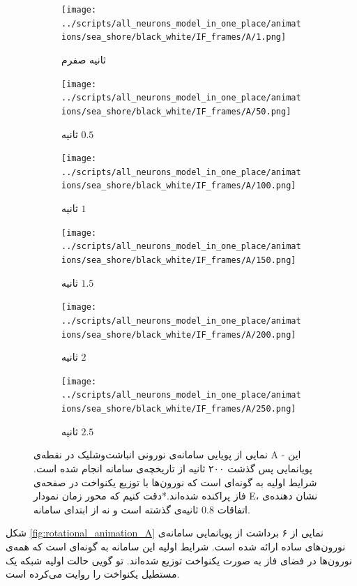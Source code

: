 \newpage
\begin{figure}[!h]
	\begin{subfigure}{0.5\textwidth}
		\texttt{[image: ../scripts/all\_neurons\_model\_in\_one\_place/animations/sea\_shore/black\_white/IF\_frames/A/1.png]}
		\caption{
			ثانیه صفرم		
		}
	\end{subfigure}
	\hfill
	\begin{subfigure}{0.5\textwidth}
		\texttt{[image: ../scripts/all\_neurons\_model\_in\_one\_place/animations/sea\_shore/black\_white/IF\_frames/A/50.png]}
		\caption{
			ثانیه $0.5$
		}
	\end{subfigure}
	\hfill
	\begin{subfigure}{0.5\textwidth}
		\texttt{[image: ../scripts/all\_neurons\_model\_in\_one\_place/animations/sea\_shore/black\_white/IF\_frames/A/100.png]}
		\caption{
			ثانیه $1$		
		}
	\end{subfigure}
	\hfill
	\begin{subfigure}{0.5\textwidth}
		\texttt{[image: ../scripts/all\_neurons\_model\_in\_one\_place/animations/sea\_shore/black\_white/IF\_frames/A/150.png]}
		\caption{
			ثانیه $1.5$
		}
	\end{subfigure}
	\hfill
	\begin{subfigure}{0.5\textwidth}
		\texttt{[image: ../scripts/all\_neurons\_model\_in\_one\_place/animations/sea\_shore/black\_white/IF\_frames/A/200.png]}
		\caption{
			ثانیه $2$
		}
	\end{subfigure}
	\hfill
	\begin{subfigure}{0.5\textwidth}
		\texttt{[image: ../scripts/all\_neurons\_model\_in\_one\_place/animations/sea\_shore/black\_white/IF\_frames/A/250.png]}
		\caption{
			ثانیه $2.5$
		}
	\end{subfigure}
	\hfill
	\caption{
		نمایی از پویایی سامانه‌ی نورونی انباشت‌وشلیک در نقطه‌ی A - این پویانمایی پس گذشت ۲۰۰ ثانیه از تاریخچه‌ی سامانه انجام شده است. شرایط اولیه به گونه‌ای است که نورون‌ها با توزیع یکنواخت در صفحه‌ی فاز پراکنده شده‌اند.*دقت کنیم که محور زمان نمودار E، نشان دهنده‌ی اتفاقات 
		$0.8$
		ثانیه‌ی گذشته است و نه از ابتدای سامانه.	
	}
	\label{fig:IF_animation_A}
\end{figure}
\newpage
{}
شکل
\ref{fig:rotational_animation_A}
نمایی از ۶ برداشت از پویانمایی سامانه‌ی نورون‌های ساده ارائه شده است. شرایط اولیه این سامانه به گونه‌ای است که همه‌ی نورون‌ها در فضای فاز به صورت یکنواخت توزیع شده‌اند. تو گویی حالت اولیه شبکه یک مستطیل یکنواخت را روایت می‌کرده است.\\

